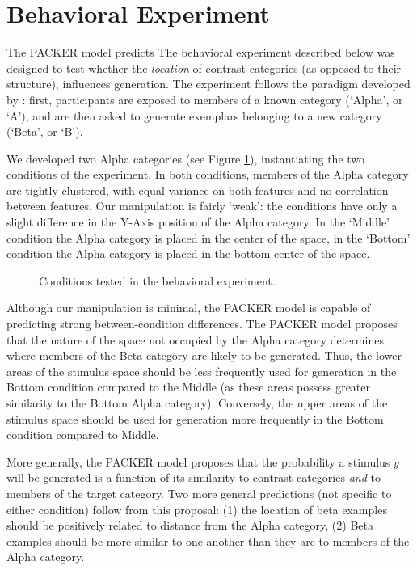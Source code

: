 \documentclass[10pt,letterpaper]{article}
\begin{document}
\section{Behavioral Experiment}

The PACKER model predicts
The behavioral experiment described below was designed to test whether the \textit{location} of contrast categories (as opposed to their structure), influences generation. The experiment follows the paradigm developed by \citet{jern2013probabilistic}: first, participants are exposed to members of a known category (`Alpha', or `A'), and are then asked to generate exemplars belonging to a new category (`Beta', or `B'). 

We developed two Alpha categories (see Figure \ref{fig:middle-bottom-conditions}), instantiating the two conditions of the experiment. In both conditions, members of the Alpha category are tightly clustered, with equal variance on both features and no correlation between features. Our manipulation is fairly `weak': the conditions have only a slight difference in the Y-Axis position of the Alpha category. In the `Middle' condition the Alpha category is placed in the center of the space, in the `Bottom' condition the Alpha category is placed in the bottom-center of the space. 

\begin{figure}
    \begin{center}
    
    \caption{Conditions tested in the behavioral experiment.}
    \label{fig:middle-bottom-conditions}
    \end{center}
\end{figure}

Although our manipulation is minimal, the PACKER model is capable of predicting strong between-condition differences. The PACKER model proposes that the nature of the space not occupied by the Alpha category determines where members of the Beta category are likely to be generated. Thus, the lower areas of the stimulus space should be less frequently used for generation in the Bottom condition compared to the Middle (as these areas possess greater similarity to the Bottom Alpha category). Conversely, the upper areas of the stimulus space should be used for generation more frequently in the Bottom condition compared to Middle.

More generally, the PACKER model proposes that the probability a stimulus $y$ will be generated is a function of its similarity to contrast categories \textit{and} to members of the target category. Two more general predictions (not specific to either condition) follow from this proposal: (1) the location of beta examples should be positively related to distance from the Alpha category, (2) Beta examples should be more similar to one another than they are to members of the Alpha category.
\end{document}
